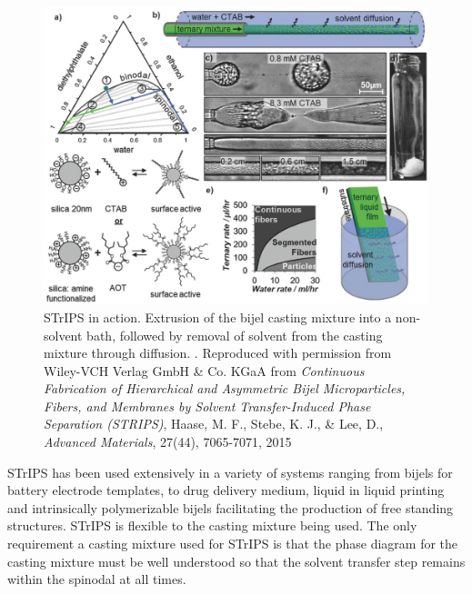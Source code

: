 \begin{figure}[h]
    \centering
    \includegraphics[scale = 5]{figures/introduction/STrIPS.jpg}
    \caption{STrIPS in action. Extrusion of the bijel casting mixture into a non-solvent bath, followed by removal of solvent from 
             the casting mixture through diffusion. \cite{haase_continuous_2015}. Reproduced with permission from Wiley-VCH Verlag GmbH 
             \& Co. KGaA from \textit{Continuous Fabrication of Hierarchical and Asymmetric Bijel Microparticles, Fibers, and Membranes by 
             Solvent Transfer-Induced Phase Separation (STRIPS)}, Haase, M. F., Stebe, K. J., 
             \& Lee, D., \textit{Advanced Materials}, 27(44), 7065-7071, 2015}
    \label{fig:strips}
\end{figure}

STrIPS has been used extensively in a variety of systems ranging from bijels for battery electrode templates, to drug delivery medium, liquid in liquid printing and
intrinsically polymerizable bijels facilitating the production of free standing structures.
\cite{garcia_scalable_2019,thorson_bijel-templated_2019, amirfattahi_fabrication_2024, ching_rapid_2021} STrIPS is flexible to the casting mixture being used. The
only requirement a casting mixture used for STrIPS is that the phase diagram for the casting mixture must be well understood so that the solvent transfer step remains
within the spinodal at all times. 

